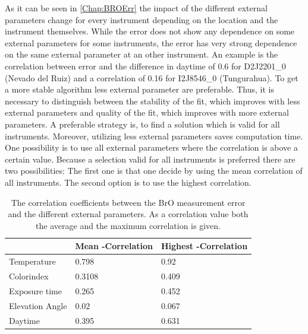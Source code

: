 \documentclass  [
  paper    = a4,
  BCOR     = 10mm,
  twoside,
  fontsize = 12pt,
  fleqn,
  toc      = bibnumbered,
  toc      = listofnumbered,
  numbers  = noendperiod,
  headings = normal,
  listof   = leveldown,
  version  = 3.03
]                                       {scrreprt}
\newcommand{\myrowcolour}{\rowcolor[gray]{0.925}}
\begin{document}
	As it can be seen in \cref{Chap:BROErr} the impact of the different external parameters change for every instrument depending on the location and the instrument themselves. 
	While the   error does not show any dependence on some external parameters for some instruments, the error has very strong dependence on the same external parameter at an other instrument. An example is the correlation between   error and the difference in daytime of 0.6 for D2J2201\_0 (Nevado del Ruiz) and a correlation of 0.16 for I2J8546\_0 (Tungurahua).
	To get a more stable algorithm less external parameter are preferable. Thus, it is necessary to distinguish between the stability of the fit, which improves with less external parameters and quality of the fit, which improves with more external parameters. 
	A preferable strategy is, to find a solution which is valid for all instruments. Moreover, utilizing less external parameters saves computation time.
	One possibility is to use all external parameters where the correlation is above a certain value. Because a selection valid for all instruments is preferred there are two possibilities: The first one is that one decide by using the mean correlation of all instruments. The second option is to use the highest correlation.
	
	\begin{table}[h]
		\centering
		\caption{The correlation coefficients between the BrO measurement error and the different external parameters. As a correlation value both the average and the maximum correlation is given.}
		\begin{tabular}{p{4cm}p{3cm}p{3cm}}
			&  Mean -Correlation&  Highest   -Correlation\\
			\toprule
			Temperature &0.798&	0.92\\
			\myrowcolour%
			Colorindex &0.3108&	0.409\\
			Exposure time &0.265&	0.452\\
			\myrowcolour%
			Elevation Angle &0.02&	0.067\\
			Daytime &0.395&	0.631\\
			\bottomrule		
		\end{tabular}
	\label{tab:CorrEP}
	\end{table}
\end{document}
